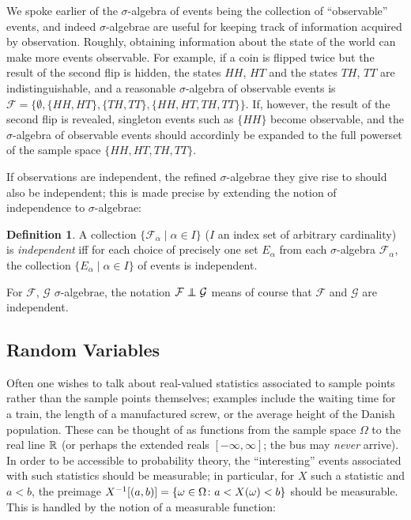 \documentclass{article}
\theoremstyle{definition}
\newtheorem{definition}[theorem]{Definition}
\newcommand{\bldset}[2]{\{{#1}\mid{#2}\}}
\newcommand\indep{\protect\mathpalette{\protect\independenT}{\perp}}
\def\independenT#1#2{\mathrel{\rlap{$#1#2$}\mkern2mu{#1#2}}}
\begin{document}
We spoke earlier of the $\sigma$-algebra of events being the collection of ``observable'' events, and indeed $\sigma$-algebrae are useful for keeping track of information acquired by observation. Roughly, obtaining information about the state of the world can make more events observable. For example, if a coin is flipped twice but the result of the second flip is hidden, the states $HH$, $HT$ and the states $TH$, $TT$ are indistinguishable, and a reasonable $\sigma$-algebra of observable events is $\mathcal F = \{\emptyset, \{HH, HT\},\{TH, TT\}, \{HH, HT, TH, TT\}\}$. If, however, the result of the second flip is revealed, singleton events such as $\{HH\}$ become observable, and the $\sigma$-algebra of observable events should accordinly be expanded to the full powerset of the sample space $\{HH, HT, TH, TT\}$.

If observations are independent, the refined $\sigma$-algebrae they give rise to should also be independent; this is made precise by extending the notion of independence to $\sigma$-algebrae:

\begin{definition}
A collection $\bldset{\mathcal F_\alpha}{\alpha \in I}$ ($I$ an index set of arbitrary cardinality) is {\em independent} iff for each choice of precisely one set $E_\alpha$ from each $\sigma$-algebra $\mathcal F_\alpha$, the collection $\bldset{E_\alpha}{\alpha \in I}$ of events is independent.
\end{definition}

For $\mathcal F$, $\mathcal G$ $\sigma$-algebrae, the notation $\mathcal F \indep \mathcal G$ means of course that $\mathcal F$ and $\mathcal G$ are independent.

\subsection{Random Variables}

Often one wishes to talk about real-valued statistics associated to sample points rather than the sample points themselves; examples include the waiting time for a train, the length of a manufactured screw, or the average height of the Danish population. These can be thought of as functions from the sample space $\Omega$ to the real line $\mathbb{R}$ (or perhaps the extended reals $[-\infty, \infty]$; the bus may {\em never} arrive). In order to be accessible to probability theory, the ``interesting'' events associated with such statistics should be measurable; in particular, for $X$ such a statistic and $a < b$, the preimage $X^{-1}[(a,b)] = \{\omega \in \Omega\colon a < X(\omega) < b\}$ should be measurable. This is handled by the notion of a measurable function:
\end{document}
